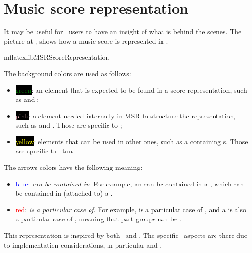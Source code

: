 



\chapter{Music score representation}\label{Music score representation}

It may be useful for \mf\ users to have an insight of what is behind the scenes.
The picture at , shows how a music score is represented in \msrRepr.

{mflatexlibMSRScoreRepresentation}

The background colors are used as follows:
\begin{itemize}
\item \colorbox{black}{\textcolor{green}{green}}: an element that is expected to be found in a score representation, such as  and ;

\item \colorbox{black}{\textcolor{pink}{pink}}: a element needed internally in MSR to structure the representation, such as  and . Those are specific to \mf;

\item \colorbox{black}{\textcolor{yellow}{yellow}}: elements that can be used in other ones, such as a  containing s. Those are specific to \mf\ too.
\end{itemize}

The arrows colors have the following meaning:
\begin{itemize}
\item \textcolor{blue}{blue}: {\it can be contained in}. For example, an  can be contained in a , which can be contained in (attached to) a .

\item \textcolor{red}{red}: {\it is a particular case of}. For example,  is a particular case of , and a  is also a particular case of , meaning that part groups can be .
\end{itemize}

This representation is inspired by both \mxml\ and \lily. The specific \mf\ aspects are there due to implementation considerations, in particular  and .
